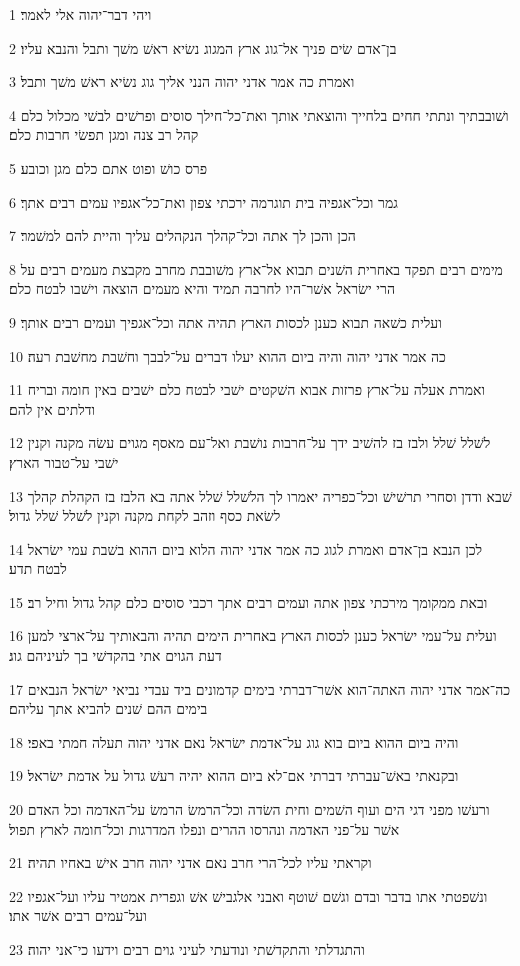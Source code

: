 \par 1 ויהי דבר־יהוה אלי לאמר׃
\par 2 בן־אדם שׂים פניך אל־גוג ארץ המגוג נשׂיא ראשׁ משׁך ותבל והנבא עליו׃
\par 3 ואמרת כה אמר אדני יהוה הנני אליך גוג נשׂיא ראשׁ משׁך ותבל׃
\par 4 ושׁובבתיך ונתתי חחים בלחייך והוצאתי אותך ואת־כל־חילך סוסים ופרשׁים לבשׁי מכלול כלם קהל רב צנה ומגן תפשׂי חרבות כלם׃
\par 5 פרס כושׁ ופוט אתם כלם מגן וכובע׃
\par 6 גמר וכל־אגפיה בית תוגרמה ירכתי צפון ואת־כל־אגפיו עמים רבים אתך׃
\par 7 הכן והכן לך אתה וכל־קהלך הנקהלים עליך והיית להם למשׁמר׃
\par 8 מימים רבים תפקד באחרית השׁנים תבוא אל־ארץ משׁובבת מחרב מקבצת מעמים רבים על הרי ישׂראל אשׁר־היו לחרבה תמיד והיא מעמים הוצאה וישׁבו לבטח כלם׃
\par 9 ועלית כשׁאה תבוא כענן לכסות הארץ תהיה אתה וכל־אגפיך ועמים רבים אותך׃
\par 10 כה אמר אדני יהוה והיה ביום ההוא יעלו דברים על־לבבך וחשׁבת מחשׁבת רעה׃
\par 11 ואמרת אעלה על־ארץ פרזות אבוא השׁקטים ישׁבי לבטח כלם ישׁבים באין חומה ובריח ודלתים אין להם׃
\par 12 לשׁלל שׁלל ולבז בז להשׁיב ידך על־חרבות נושׁבת ואל־עם מאסף מגוים עשׂה מקנה וקנין ישׁבי על־טבור הארץ׃
\par 13 שׁבא ודדן וסחרי תרשׁישׁ וכל־כפריה יאמרו לך הלשׁלל שׁלל אתה בא הלבז בז הקהלת קהלך לשׂאת כסף וזהב לקחת מקנה וקנין לשׁלל שׁלל גדול׃
\par 14 לכן הנבא בן־אדם ואמרת לגוג כה אמר אדני יהוה הלוא ביום ההוא בשׁבת עמי ישׂראל לבטח תדע׃
\par 15 ובאת ממקומך מירכתי צפון אתה ועמים רבים אתך רכבי סוסים כלם קהל גדול וחיל רב׃
\par 16 ועלית על־עמי ישׂראל כענן לכסות הארץ באחרית הימים תהיה והבאותיך על־ארצי למען דעת הגוים אתי בהקדשׁי בך לעיניהם גוג׃
\par 17 כה־אמר אדני יהוה האתה־הוא אשׁר־דברתי בימים קדמונים ביד עבדי נביאי ישׂראל הנבאים בימים ההם שׁנים להביא אתך עליהם׃
\par 18 והיה ביום ההוא ביום בוא גוג על־אדמת ישׂראל נאם אדני יהוה תעלה חמתי באפי׃
\par 19 ובקנאתי באשׁ־עברתי דברתי אם־לא ביום ההוא יהיה רעשׁ גדול על אדמת ישׂראל׃
\par 20 ורעשׁו מפני דגי הים ועוף השׁמים וחית השׂדה וכל־הרמשׂ הרמשׂ על־האדמה וכל האדם אשׁר על־פני האדמה ונהרסו ההרים ונפלו המדרגות וכל־חומה לארץ תפול׃
\par 21 וקראתי עליו לכל־הרי חרב נאם אדני יהוה חרב אישׁ באחיו תהיה׃
\par 22 ונשׁפטתי אתו בדבר ובדם וגשׁם שׁוטף ואבני אלגבישׁ אשׁ וגפרית אמטיר עליו ועל־אגפיו ועל־עמים רבים אשׁר אתו׃
\par 23 והתגדלתי והתקדשׁתי ונודעתי לעיני גוים רבים וידעו כי־אני יהוה׃

